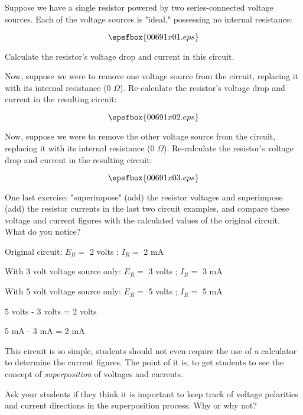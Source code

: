 

Suppose we have a single resistor powered by two series-connected voltage sources.  Each of the voltage sources is "ideal," possessing no internal resistance:

$$\epsfbox{00691x01.eps}$$

Calculate the resistor's voltage drop and current in this circuit.

\vskip 10pt

Now, suppose we were to remove one voltage source from the circuit, replacing it with its internal resistance (0 $\Omega$).  Re-calculate the resistor's voltage drop and current in the resulting circuit:

$$\epsfbox{00691x02.eps}$$

\vskip 10pt

Now, suppose we were to remove the other voltage source from the circuit, replacing it with its internal resistance (0 $\Omega$).  Re-calculate the resistor's voltage drop and current in the resulting circuit:

$$\epsfbox{00691x03.eps}$$

\vskip 10pt

One last exercise: "superimpose" (add) the resistor voltages and superimpose (add) the resistor currents in the last two circuit examples, and compare these voltage and current figures with the calculated values of the original circuit.  What do you notice?







Original circuit: $E_R =$ 2 volts ; $I_R =$ 2 mA

\vskip 10pt

With 3 volt voltage source only: $E_R =$ 3 volts ; $I_R =$ 3 mA

\vskip 10pt

With 5 volt voltage source only: $E_R =$ 5 volts ; $I_R =$ 5 mA

\vskip 10pt

5 volts - 3 volts = 2 volts

5 mA - 3 mA = 2 mA







This circuit is so simple, students should not even require the use of a calculator to determine the current figures.  The point of it is, to get students to see the concept of {\it superposition} of voltages and currents.

Ask your students if they think it is important to keep track of voltage polarities and current directions in the superposition process.  Why or why not?




